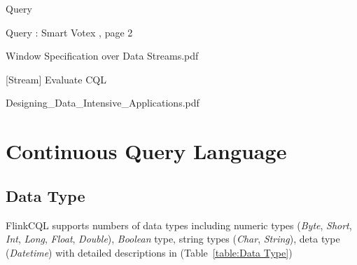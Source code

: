 Query \citep{Babcock:2002} 

Query : Smart Votex , page 2

Window Specification over Data Streams.pdf

[Stream] Evaluate CQL

Designing\_Data\_Intensive\_Applications.pdf




	


\section{Continuous Query Language} \label{language}

\subsection{Data Type}

FlinkCQL supports numbers of data types including numeric types (\textit{Byte}, \textit{Short}, \textit{Int}, \textit{Long}, \textit{Float}, \textit{Double}), \textit{Boolean}  type, string types (\textit{Char}, \textit{String}), deta type (\textit{Datetime}) with detailed descriptions in (Table~\ref{table:Data Type})


